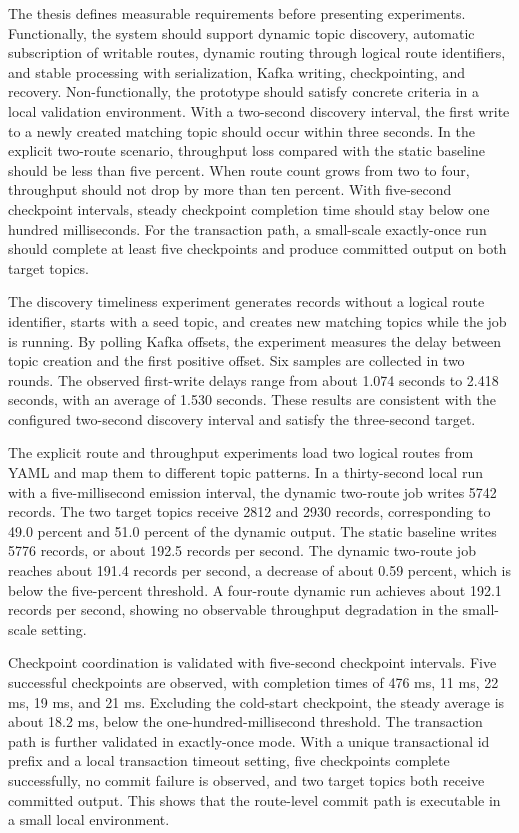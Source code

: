 The thesis defines measurable requirements before presenting experiments. Functionally, the system should support dynamic topic discovery, automatic subscription of writable routes, dynamic routing through logical route identifiers, and stable processing with serialization, Kafka writing, checkpointing, and recovery. Non-functionally, the prototype should satisfy concrete criteria in a local validation environment. With a two-second discovery interval, the first write to a newly created matching topic should occur within three seconds. In the explicit two-route scenario, throughput loss compared with the static baseline should be less than five percent. When route count grows from two to four, throughput should not drop by more than ten percent. With five-second checkpoint intervals, steady checkpoint completion time should stay below one hundred milliseconds. For the transaction path, a small-scale exactly-once run should complete at least five checkpoints and produce committed output on both target topics.

The discovery timeliness experiment generates records without a logical route identifier, starts with a seed topic, and creates new matching topics while the job is running. By polling Kafka offsets, the experiment measures the delay between topic creation and the first positive offset. Six samples are collected in two rounds. The observed first-write delays range from about 1.074 seconds to 2.418 seconds, with an average of 1.530 seconds. These results are consistent with the configured two-second discovery interval and satisfy the three-second target.

The explicit route and throughput experiments load two logical routes from YAML and map them to different topic patterns. In a thirty-second local run with a five-millisecond emission interval, the dynamic two-route job writes 5742 records. The two target topics receive 2812 and 2930 records, corresponding to 49.0 percent and 51.0 percent of the dynamic output. The static baseline writes 5776 records, or about 192.5 records per second. The dynamic two-route job reaches about 191.4 records per second, a decrease of about 0.59 percent, which is below the five-percent threshold. A four-route dynamic run achieves about 192.1 records per second, showing no observable throughput degradation in the small-scale setting.

Checkpoint coordination is validated with five-second checkpoint intervals. Five successful checkpoints are observed, with completion times of 476 ms, 11 ms, 22 ms, 19 ms, and 21 ms. Excluding the cold-start checkpoint, the steady average is about 18.2 ms, below the one-hundred-millisecond threshold. The transaction path is further validated in exactly-once mode. With a unique transactional id prefix and a local transaction timeout setting, five checkpoints complete successfully, no commit failure is observed, and two target topics both receive committed output. This shows that the route-level commit path is executable in a small local environment.

